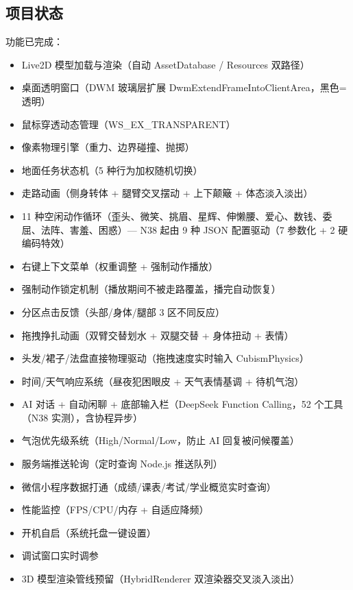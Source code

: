 \documentclass[12pt,a4paper]{ctexart}
\begin{document}
\subsection{项目状态}

功能已完成：
\begin{itemize}
    \item Live2D 模型加载与渲染（自动 AssetDatabase / Resources 双路径）
    \item 桌面透明窗口（DWM 玻璃层扩展 DwmExtendFrameIntoClientArea，黑色=透明）
    \item 鼠标穿透动态管理（WS\_EX\_TRANSPARENT）
    \item 像素物理引擎（重力、边界碰撞、抛掷）
    \item 地面任务状态机（5 种行为加权随机切换）
    \item 走路动画（侧身转体 + 腿臂交叉摆动 + 上下颠簸 + 体态淡入淡出）
    \item 11 种空闲动作循环（歪头、微笑、挑眉、星辉、伸懒腰、爱心、数钱、委屈、法阵、害羞、困惑）— N38 起由 9 种 JSON 配置驱动（7 参数化 + 2 硬编码特效）
    \item 右键上下文菜单（权重调整 + 强制动作播放）
    \item 强制动作锁定机制（播放期间不被走路覆盖，播完自动恢复）
    \item 分区点击反馈（头部/身体/腿部 3 区不同反应）
    \item 拖拽挣扎动画（双臂交替划水 + 双腿交替 + 身体扭动 + 表情）
    \item 头发/裙子/法盘直接物理驱动（拖拽速度实时输入 CubismPhysics）
    \item 时间/天气响应系统（昼夜犯困眼皮 + 天气表情基调 + 待机气泡）
    \item AI 对话 + 自动闲聊 + 底部输入栏（DeepSeek Function Calling，52 个工具（N38 实测），含协程异步）
    \item 气泡优先级系统（High/Normal/Low，防止 AI 回复被问候覆盖）
    \item 服务端推送轮询（定时查询 Node.js 推送队列）
    \item 微信小程序数据打通（成绩/课表/考试/学业概览实时查询）
    \item 性能监控（FPS/CPU/内存 + 自适应降频）
    \item 开机自启（系统托盘一键设置）
    \item 调试窗口实时调参
    \item 3D 模型渲染管线预留（HybridRenderer 双渲染器交叉淡入淡出）
\end{itemize}
\end{document}
